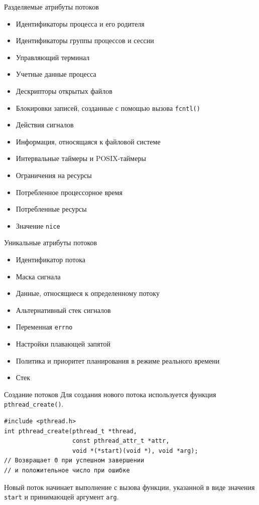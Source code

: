 \documentclass{beamer}
\begin{document}
\begin{frame}{Разделяемые атрибуты потоков}
    \begin{itemize}
        \item Идентификаторы процесса и его родителя
        \item Идентификаторы группы процессов и сессии
        \item Управляющий терминал
        \item Учетные данные процесса
        \item Дескрипторы открытых файлов
        \item Блокировки записей, созданные с помощью вызова \texttt{fcntl()}
        \item Действия сигналов
        \item Информация, относящаяся к файловой системе
        \item Интервальные таймеры и POSIX-таймеры
        \item Ограничения на ресурсы
        \item Потребленное процессорное время
        \item Потребленные ресурсы
        \item Значение \texttt{nice}
    \end{itemize}
\end{frame}

\begin{frame}{Уникальные атрибуты потоков}
    \begin{itemize}
        \item Идентификатор потока
        \item Маска сигнала
        \item Данные, относящиеся к определенному потоку
        \item Альтернативный стек сигналов
        \item Переменная \texttt{errno}
        \item Настройки плавающей запятой
        \item Политика и приоритет планирования в режиме реального времени 
        \item Стек
    \end{itemize}
\end{frame}

\begin{frame}[fragile]{Создание потоков}
    Для создания нового потока используется функция \texttt{pthread\_create()}.
    
\begin{verbatim}
#include <pthread.h>
int pthread_create(pthread_t *thread, 
                   const pthread_attr_t *attr,
                   void *(*start)(void *), void *arg);
// Возвращает 0 при успешном завершении 
// и положительное число при ошибке
\end{verbatim}
    
    Новый поток начинает выполнение с вызова функции, указанной в виде значения \texttt{start} и принимающей аргумент \texttt{arg}.
\end{frame}
\end{document}
